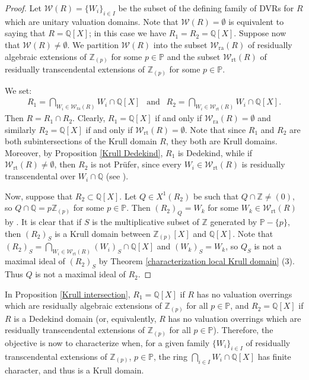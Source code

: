 \documentclass[10pt]{article}
\numberwithin{equation}{section}
\theoremstyle{definition}
\theoremstyle{definition}
\newcommand{\Q}{\mathbb{Q}}
\newcommand{\Z}{\mathbb{Z}}
\newcommand{\PP}{\mathbb{P}}
\begin{document}
\begin{proof}
Let $\mathcal W(R)=\{W_i\}_{i\in I}$ be the subset of the defining family of DVRs for $R$ which are unitary valuation domains.
Note that $\mathcal W(R)=\emptyset$ is equivalent to saying that $R=\Q[X]$; in this case we have $R_1=R_2=\Q[X]$.
Suppose now that $\mathcal W(R)\not=\emptyset$.
We partition $\mathcal W(R)$ into the subset $\mathcal{W}_{\text{ra}}(R)$ of residually algebraic extensions of $\Z_{(p)}$ for some $p\in\PP$
and the subset $\mathcal{W}_{\text{rt}}(R)$ of residually transcendental extensions of $\Z_{(p)}$ for some $p\in\PP$.

We set:
\begin{align*}
R_1=\bigcap_{W_i\in \mathcal{W}_{\text{ra}}(R)}W_i\cap\Q[X] \ \ \text{ and } \ \
R_2=\bigcap_{W_i\in \mathcal{W}_{\text{rt}}(R)}W_i\cap\Q[X].
\end{align*}
Then $R=R_1\cap R_2$. Clearly, $R_1=\Q[X]$ if and only if $\mathcal{W}_{\text{ra}}(R)=\emptyset$ and similarly $R_2=\Q[X]$ if and only if $\mathcal{W}_{\text{rt}}(R)=\emptyset$.
Note that since $R_1$ and $R_2$ are both subintersections of the Krull domain $R$, they both are Krull domains.
Moreover, by Proposition \ref{Krull Dedekind},
$R_1$ is Dedekind, while if $\mathcal{W}_{\text{rt}}(R)\not=\emptyset$, then $R_2$ is not Pr\"ufer,
since every $W_i\in \mathcal{W}_{\text{rt}}(R)$ is residually transcendental over $W_i\cap\Q$ (see \cite[Theorem 3.14]{PerPrufer}).

Now, suppose that $R_2\subset\Q[X]$. Let $Q \in X^1(R_2)$ be such that $Q \cap \Z\neq (0)$,
so $Q \cap \Q = p\Z_{(p)}$ for some $p \in \PP$.
Then ${(R_2)}_{Q} = W_k$ for some $W_k \in \mathcal{W}_{\text{rt}}(R)$ by \cite[Corollary 2.3(i)]{Chang}.
It is clear that if $S$ is the multiplicative subset of $\Z$ generated by $\PP - \{p\}$, then
${(R_2)}_S$ is a Krull domain between $\Z_{(p)}[X]$ and $\Q[X]$.
Note that $(R_2)_S = \bigcap\limits_{W_i\in \mathcal{W}_{\text{rt}}(R)}(W_i)_S\cap\Q[X]$
and ${(W_k)}_S = W_k$, so $Q_S$ is not a maximal ideal of ${(R_2)}_S$ by Theorem \ref{characterization local Krull domain} (3).
Thus $Q$ is not a maximal ideal of $R_2$.
\end{proof}

In Proposition \ref{Krull intersection},
$R_1=\Q[X]$ if $R$ has no valuation overrings which are residually algebraic extensions of $\Z_{(p)}$ for all $p\in\PP$,
and $R_2= \Q[X]$ if $R$ is a Dedekind domain (or, equivalently, $R$ has no valuation overrings
which are residually transcendental  extensions of $\Z_{(p)}$ for all $p\in\PP$).
Therefore, the objective is now to  characterize when, for a given family $\{W_i\}_{i\in I}$ of residually transcendental extensions of $\Z_{(p)}$, $p\in\PP$, the ring $\bigcap\limits_{i\in I}W_i\cap\Q[X]$ has finite character, and thus is a Krull domain.
\end{document}
